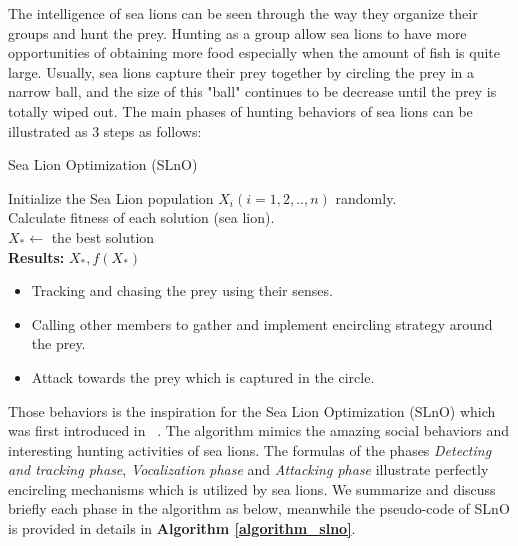 \documentclass[a4paper,13pt,2p]{report}
\begin{document}
	The intelligence of sea lions can be seen through the way they organize their groups and hunt the prey. Hunting as a group allow sea lions to have more opportunities of obtaining more food especially when the amount of fish is quite large. Usually, sea lions capture their prey together by circling the prey in a narrow ball, and the size of this "ball" continues to be decrease until the prey is totally wiped out. The main phases of hunting behaviors of sea lions can be illustrated as 3 steps as follows:
	
\begin{algorithm}[!t]
\caption{Sea Lion Optimization (SLnO)}
\label{algorithm_slno}
\SetAlgoLined
 Initialize the Sea Lion population $X_i (i=1,2,.., n)$ randomly. \\
 Calculate fitness of each solution (sea lion). \\
 $X_*\gets$ the best solution \\
 \textbf{Results:}  $X_*, f(X_*)$
\end{algorithm}
	
\begin{itemize}
\item Tracking and chasing the prey using their senses.
\item Calling other members to gather and implement encircling strategy around the prey.
\item Attack towards the prey which is captured in the circle.
\end{itemize}

	Those behaviors is the inspiration for the Sea Lion Optimization (SLnO) which was first introduced in ~\cite{masadeh2019sea}. The algorithm mimics the amazing social behaviors and interesting hunting activities of sea lions. The formulas of the phases \textit{Detecting and tracking phase}, \textit{Vocalization phase} and \textit{Attacking phase} illustrate perfectly encircling mechanisms which is utilized by sea lions. We summarize and discuss briefly each phase in the algorithm as below, meanwhile the pseudo-code of SLnO is provided in details in \textbf{Algorithm \ref{algorithm_slno}}.
\end{document}

